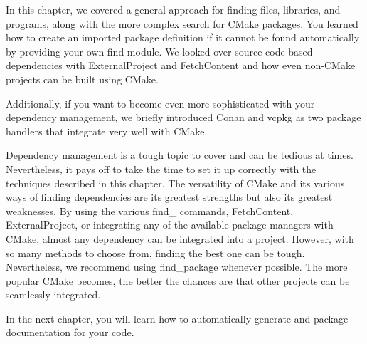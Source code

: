 In this chapter, we covered a general approach for finding files, libraries, and programs, along with the more complex search for CMake packages. You learned how to create an imported package definition if it cannot be found automatically by providing your own find module. We looked over source code-based dependencies with ExternalProject and FetchContent and how even non-CMake projects can be built using CMake.

Additionally, if you want to become even more sophisticated with your dependency management, we briefly introduced Conan and vcpkg as two package handlers that integrate very well with CMake.

Dependency management is a tough topic to cover and can be tedious at times. Nevertheless, it pays off to take the time to set it up correctly with the techniques described in this chapter. The versatility of CMake and its various ways of finding dependencies are its greatest strengths but also its greatest weaknesses. By using the various find\_ commands, FetchContent, ExternalProject, or integrating any of the available package managers with CMake, almost any dependency can be integrated into a project. However, with so many methods to choose from, finding the best one can be tough. Nevertheless, we recommend using find\_package whenever possible. The more popular CMake becomes, the better the chances are that other projects can be seamlessly integrated.

In the next chapter, you will learn how to automatically generate and package documentation for your code.